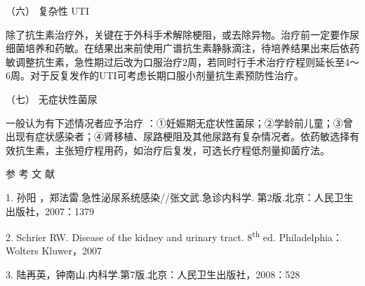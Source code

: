 \hypertarget{text00345.htmlux5cux23CHP13-6-3-2-6}{}
（六） 复杂性 UTI

除了抗生素治疗外，关键在于外科手术解除梗阻，或去除异物。治疗前一定要作尿细菌培养和药敏。在结果出来前使用广谱抗生素静脉滴注，待培养结果出来后依药敏调整抗生素，急性期过后改为口服治疗2周，若同时行手术治疗疗程则延长至4～6周。对于反复发作的UTI可考虑长期口服小剂量抗生素预防性治疗。

\hypertarget{text00345.htmlux5cux23CHP13-6-3-2-7}{}
（七） 无症状性菌尿

一般认为有下述情况者应予治疗
：①妊娠期无症状性菌尿；②学龄前儿童；③曾出现有症状感染者；④肾移植、尿路梗阻及其他尿路有复杂情况者。依药敏选择有效抗生素，主张短疗程用药，如治疗后复发，可选长疗程低剂量抑菌疗法。

\protect\hypertarget{text00346.html}{}{}

\hypertarget{text00346.htmlux5cux23CHP13-6-4}{}
参 考 文 献

1. 孙阳 ，郑法雷.急性泌尿系统感染//张文武.急诊内科学.
第2版.北京：人民卫生出版社，2007：1379

2. Schrier RW. Disease of the kidney and urinary tract.
8\textsuperscript{th} ed. Philadelphia：Wolters Kluwer，2007

3. 陆再英，钟南山.内科学.第7版.北京：人民卫生出版社，2008：528

\protect\hypertarget{text00347.html}{}{}

